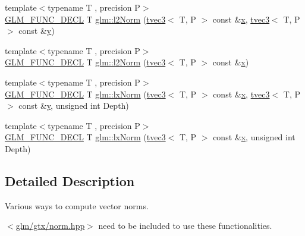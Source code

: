 \begin{DoxyCompactItemize}
\item 
{\footnotesize template$<$typename T , precision P$>$ }\\\mbox{\hyperlink{setup_8hpp_ab2d052de21a70539923e9bcbf6e83a51}{G\+L\+M\+\_\+\+F\+U\+N\+C\+\_\+\+D\+E\+CL}} T \mbox{\hyperlink{group__gtx__norm_gafa6fbbc99cd44d81bf030e74eaf7ad64}{glm\+::l2\+Norm}} (\mbox{\hyperlink{structglm_1_1tvec3}{tvec3}}$<$ T, P $>$ const \&\mbox{\hyperlink{glad_8h_a92d0386e5c19fb81ea88c9f99644ab1d}{x}}, \mbox{\hyperlink{structglm_1_1tvec3}{tvec3}}$<$ T, P $>$ const \&\mbox{\hyperlink{glad_8h_a66ddd433d2cacfe27f5906b7e86faeed}{y}})
\item 
{\footnotesize template$<$typename T , precision P$>$ }\\\mbox{\hyperlink{setup_8hpp_ab2d052de21a70539923e9bcbf6e83a51}{G\+L\+M\+\_\+\+F\+U\+N\+C\+\_\+\+D\+E\+CL}} T \mbox{\hyperlink{group__gtx__norm_ga0a8cb8a0ce88d1d977de23209bf04610}{glm\+::l2\+Norm}} (\mbox{\hyperlink{structglm_1_1tvec3}{tvec3}}$<$ T, P $>$ const \&\mbox{\hyperlink{glad_8h_a92d0386e5c19fb81ea88c9f99644ab1d}{x}})
\item 
{\footnotesize template$<$typename T , precision P$>$ }\\\mbox{\hyperlink{setup_8hpp_ab2d052de21a70539923e9bcbf6e83a51}{G\+L\+M\+\_\+\+F\+U\+N\+C\+\_\+\+D\+E\+CL}} T \mbox{\hyperlink{group__gtx__norm_ga932bb0854e5c5a6ab5a14b023c451ca7}{glm\+::lx\+Norm}} (\mbox{\hyperlink{structglm_1_1tvec3}{tvec3}}$<$ T, P $>$ const \&\mbox{\hyperlink{glad_8h_a92d0386e5c19fb81ea88c9f99644ab1d}{x}}, \mbox{\hyperlink{structglm_1_1tvec3}{tvec3}}$<$ T, P $>$ const \&\mbox{\hyperlink{glad_8h_a66ddd433d2cacfe27f5906b7e86faeed}{y}}, unsigned int Depth)
\item 
{\footnotesize template$<$typename T , precision P$>$ }\\\mbox{\hyperlink{setup_8hpp_ab2d052de21a70539923e9bcbf6e83a51}{G\+L\+M\+\_\+\+F\+U\+N\+C\+\_\+\+D\+E\+CL}} T \mbox{\hyperlink{group__gtx__norm_gaab931b0d1acfe2f9c1cb78311edf24fc}{glm\+::lx\+Norm}} (\mbox{\hyperlink{structglm_1_1tvec3}{tvec3}}$<$ T, P $>$ const \&\mbox{\hyperlink{glad_8h_a92d0386e5c19fb81ea88c9f99644ab1d}{x}}, unsigned int Depth)
\end{DoxyCompactItemize}


\subsection{Detailed Description}
Various ways to compute vector norms. 

$<$\mbox{\hyperlink{norm_8hpp}{glm/gtx/norm.\+hpp}}$>$ need to be included to use these functionalities. 

